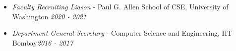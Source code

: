 \documentclass[10pt]{article}
\newenvironment{lonemidlist}[1][\enskip\textbullet]%
        {\begin{itemize}[#1,leftmargin=*,parsep=0pt,itemsep=4pt,topsep=0pt,partopsep=0pt]}
        {\end{itemize}\vspace{-.6\baselineskip}}
\begin{document}
\begin{lonemidlist}
\begin{itemize}
  \end{itemize}
  \item \textit{Faculty Recruiting Liason} - Paul G. Allen School of CSE, University of Washington \hfill{\textit{2020 - 2021}}
  \item \textit{Department General Secretary} - Computer Science and Engineering, IIT Bombay\hfill{\textit{2016 - 2017}}


\end{lonemidlist}
\end{document}
